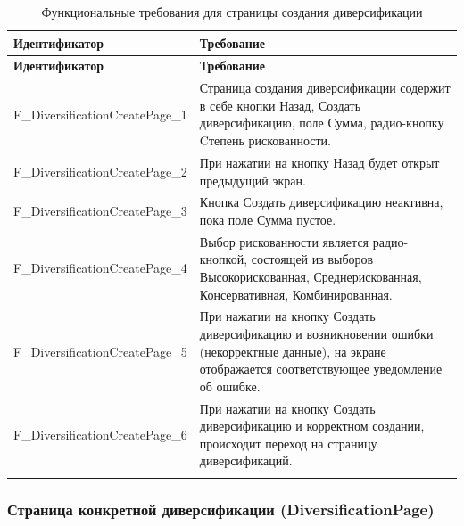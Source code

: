 \documentclass[a4paper, 14pt]{article}
\begin{document}
\begin{longtable}{| p{} | p{} |}
    \hline
    \textbf{Идентификатор}          & \textbf{Требование}                                                                                                                                                                \\
    \hline
    \endfirsthead
    \hline
    \textbf{Идентификатор}          & \textbf{Требование}                                                                                                                                                                \\
    \hline
    \endhead

    F\_DiversificationCreatePage\_1 & Страница создания диверсификации содержит в себе кнопки Назад, Создать диверсификацию, поле Сумма, радио-кнопку Cтепень рискованности.                                                          \\ \hline
    F\_DiversificationCreatePage\_2 & При нажатии на кнопку Назад будет открыт предыдущий экран.                                                                                                                         \\ \hline
    F\_DiversificationCreatePage\_3 & Кнопка Создать диверсификацию неактивна, пока поле Сумма пустое.                                                                                                                   \\ \hline
    F\_DiversificationCreatePage\_4 & Выбор рискованности является радио-кнопкой, состоящей из выборов Высокорискованная, Среднерискованная, Консервативная, Комбинированная.                                            \\ \hline
    F\_DiversificationCreatePage\_5 & При нажатии на кнопку Создать диверсификацию и возникновении ошибки (некорректные данные), на экране отображается соответствующее уведомление об ошибке.                           \\ \hline
    F\_DiversificationCreatePage\_6 & При нажатии на кнопку Создать диверсификацию и корректном создании, происходит переход на страницу диверсификаций.                                                                 \\ \hline

    \caption{Функциональные требования для страницы создания диверсификации}
\end{longtable}

\subsubsection{Страница конкретной диверсификации (DiversificationPage)}
\end{document}
